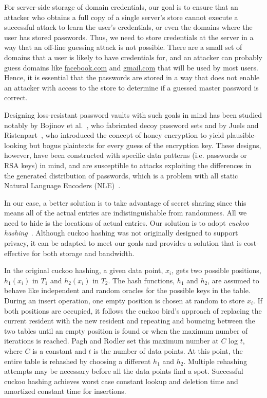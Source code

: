 For server-side storage of domain credentials, our goal is to ensure that an attacker who obtains a full copy of a single server's store cannot execute a successful attack to learn the user's credentials, or even the domains where the user has stored passwords. Thus, we need to store credentials at the server in a way that an off-line guessing attack is not possible. There are a small set of domains that a user is likely to have credentials for, and an attacker can probably guess domains like \url{facebook.com} and \url{gmail.com} that will be used by most users. Hence, it is essential that the passwords are stored in a way that does not enable an attacker with access to the store to determine if a guessed master password is correct.

Designing loss-resistant password vaults with such goals in mind has been studied notably by Bojinov et al.~\cite{bojinov2010kamouflage}, who fabricated decoy password sets and by Juels and Ristenpart~\cite{juels2014honey}, who introduced the concept of honey encryption to yield plausible-looking but bogus plaintexts for every guess of the encryption key. These designs, however, have been constructed with specific data patterns (i.e. passwords or RSA keys) in mind, and are susceptible to attacks exploiting the differences in the generated distribution of passwords, which is a problem with all static Natural Language Encoders (NLE)~\cite{Golla2016}.  

In our case, a better solution is to take advantage of secret sharing since this means all of the actual entries are indistinguishable from randomness. All we need to hide is the locations of actual entries.  Our solution is to adopt \textit{cuckoo hashing}~\cite{Pagh2001}. Although cuckoo hashing was not originally designed to support privacy, it can be adapted to meet our goals and provides a solution that is cost-effective for both storage and bandwidth. 

In the original cuckoo hashing, a given data point, $x_i$, gets two possible positions, $h_1(x_i)$ in $T_1$ and $h_2(x_i)$ in $T_2$. The hash functions, $h_1$ and $h_2$, are assumed to behave like independent and random oracles for the possible keys in the table. During an insert operation, one empty position is chosen at random to store $x_i$. If both positions are occupied, it follows the cuckoo bird's approach of replacing the current resident with the new resident and repeating and bouncing between the two tables until an empty position is found or when the maximum number of iterations is reached. Pagh and Rodler set this maximum number at $C$ log $t$, where $C$ is a constant and $t$ is the number of data points. At this point, the entire table is rehashed by choosing a different $h_1$ and $h_2$. Multiple rehashing attempts may be necessary before all the data points find a spot. Successful cuckoo hashing achieves worst case constant lookup and deletion time and amortized constant time for insertions.

